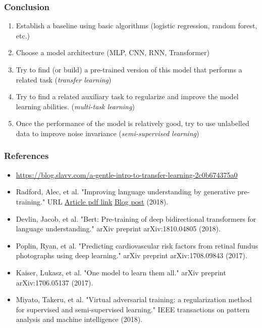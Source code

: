 \documentclass[10pt]{beamer}
\begin{document}
\begin{frame}
  \frametitle{Conclusion}

  \begin{enumerate}
    \item Establish a baseline using basic algorithms (logistic
      regression, random forest, etc.)
    \item Choose a model architecture (MLP, CNN, RNN, Transformer)
    \item Try to find (or build) a pre-trained version of this model
      that performs a related task (\emph{transfer learning})
    \item Try to find a related auxiliary task to regularize and
      improve the model learning abilities. (\emph{multi-task
        learning})
    \item Once the performance of the model is relatively good, try to
      use unlabelled data to improve noise invariance
      (\emph{semi-supervised learning})
  \end{enumerate}
\end{frame}

\begin{frame}
  \frametitle{References}

  \fontsize{6pt}{7.2}\selectfont

  \begin{itemize}
  \item \href{https://blog.slavv.com/a-gentle-intro-to-transfer-learning-2c0b674375a0}{https://blog.slavv.com/a-gentle-intro-to-transfer-learning-2c0b674375a0}
  \item Radford, Alec, et al. "Improving language understanding by generative pre-training." URL
    \href{https://s3-us-west-2.amazonaws.com/openai-assets/research-covers/language-unsupervised/language_understanding_paper.pdf}{Article pdf link}
    \href{https://blog.openai.com/language-unsupervised/}{Blog post} (2018).
  \item Devlin, Jacob, et al. "Bert: Pre-training of deep
    bidirectional transformers for language understanding." arXiv
    preprint arXiv:1810.04805 (2018).
  \item Poplin, Ryan, et al. "Predicting cardiovascular risk factors
    from retinal fundus photographs using deep learning."  arXiv
    preprint arXiv:1708.09843 (2017).
  \item Kaiser, Lukasz, et al. "One model to learn them all."  arXiv
    preprint arXiv:1706.05137 (2017).
  \item Miyato, Takeru, et al. "Virtual adversarial training: a
    regularization method for supervised and semi-supervised
    learning." IEEE transactions on pattern analysis and machine
    intelligence (2018).
  \end{itemize}
\end{frame}
\end{document}
